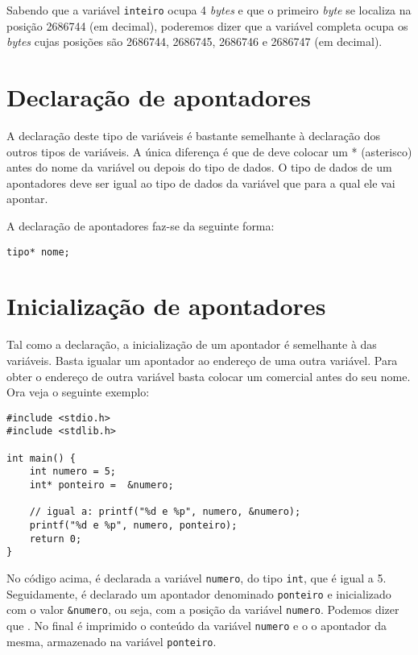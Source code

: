 Sabendo que a variável \texttt{inteiro} ocupa 4 \textit{bytes} e que o primeiro \textit{byte} se localiza na posição 2686744 (em decimal), poderemos dizer que a variável completa ocupa os \textit{bytes} cujas posições são 2686744, 2686745, 2686746 e 2686747 (em decimal).

\section{Declaração de apontadores}

A declaração deste tipo de variáveis é bastante semelhante à declaração dos outros tipos de variáveis. A única diferença é que de deve colocar um * (asterisco) antes do nome da variável ou depois do tipo de dados. O tipo de dados de um apontadores deve ser igual ao tipo de dados da variável que para a qual ele vai apontar. 

A declaração de apontadores faz-se da seguinte forma:

\begin{lstlisting}
tipo* nome;
\end{lstlisting}

\section{Inicialização de apontadores}

Tal como a declaração, a inicialização de um apontador é semelhante à das variáveis. Basta igualar um apontador ao endereço de uma outra variável. Para obter o endereço de outra variável basta colocar um  comercial antes do seu nome. Ora veja o seguinte exemplo:

\begin{lstlisting}
#include <stdio.h>
#include <stdlib.h>

int main() {
    int numero = 5;
    int* ponteiro =  &numero;
	
	// igual a: printf("%d e %p", numero, &numero);
    printf("%d e %p", numero, ponteiro); 
    return 0;
}
\end{lstlisting}

No código acima, é declarada a variável \texttt{numero}, do tipo \texttt{int}, que é igual a 5. Seguidamente, é declarado um apontador denominado \texttt{ponteiro} e inicializado com o valor \texttt{\&numero}, ou seja, com a posição da variável \texttt{numero}. Podemos dizer que . No final é imprimido o conteúdo da variável \texttt{numero} e o o apontador da mesma, armazenado na variável \texttt{ponteiro}.

